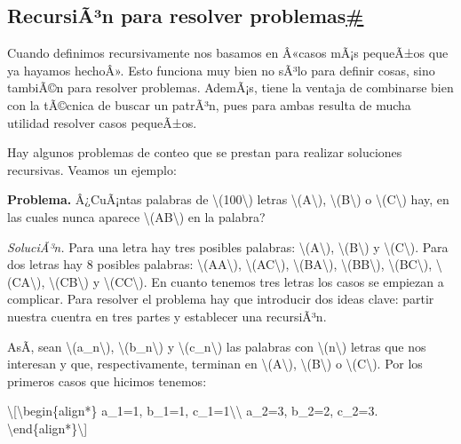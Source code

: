\label{recursion-para-resolver-problemas}
\subsection{\texorpdfstring{RecursiÃ³n para resolver
problemas\hyperref[recursion-para-resolver-problemas]{\#}}{RecursiÃ³n para resolver problemas\#}}\label{recursiuxe3uxb3n-para-resolver-problemas}

Cuando definimos recursivamente nos basamos en Â«casos mÃ¡s pequeÃ±os
que ya hayamos hechoÂ». Esto funciona muy bien no sÃ³lo para definir
cosas, sino tambiÃ©n para resolver problemas. AdemÃ¡s, tiene la ventaja
de combinarse bien con la tÃ©cnica de buscar un patrÃ³n, pues para ambas
resulta de mucha utilidad resolver casos pequeÃ±os.

Hay algunos problemas de conteo que se prestan para realizar soluciones
recursivas. Veamos un ejemplo:

\textbf{Problema.} Â¿CuÃ¡ntas palabras de
{\textbackslash(100\textbackslash)} letras
{\textbackslash(A\textbackslash)}, {\textbackslash(B\textbackslash)} o
{\textbackslash(C\textbackslash)} hay, en las cuales nunca aparece
{\textbackslash(AB\textbackslash)} en la palabra?

\emph{SoluciÃ³n.} Para una letra hay tres posibles palabras:
{\textbackslash(A\textbackslash)}, {\textbackslash(B\textbackslash)} y
{\textbackslash(C\textbackslash)}. Para dos letras hay 8 posibles
palabras: {\textbackslash(AA\textbackslash)},
{\textbackslash(AC\textbackslash)}, {\textbackslash(BA\textbackslash)},
{\textbackslash(BB\textbackslash)}, {\textbackslash(BC\textbackslash)},
{\textbackslash(CA\textbackslash)}, {\textbackslash(CB\textbackslash)} y
{\textbackslash(CC\textbackslash)}. En cuanto tenemos tres letras los
casos se empiezan a complicar. Para resolver el problema hay que
introducir dos ideas clave: partir nuestra cuentra en tres partes y
establecer una recursiÃ³n.

AsÃ­, sean {\textbackslash(a\_n\textbackslash)},
{\textbackslash(b\_n\textbackslash)} y
{\textbackslash(c\_n\textbackslash)} las palabras con
{\textbackslash(n\textbackslash)} letras que nos interesan y que,
respectivamente, terminan en {\textbackslash(A\textbackslash)},
{\textbackslash(B\textbackslash)} o {\textbackslash(C\textbackslash)}.
Por los primeros casos que hicimos tenemos:

\textbackslash{[}\textbackslash begin\{align*\} a\_1=1, b\_1=1,
c\_1=1\textbackslash\textbackslash{} a\_2=3, b\_2=2, c\_2=3.
\textbackslash end\{align*\}\textbackslash{]}

